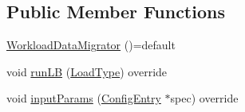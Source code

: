 \subsection*{Public Member Functions}
\begin{DoxyCompactItemize}
\item 
\hyperlink{structvt_1_1vrt_1_1collection_1_1balance_1_1replay_1_1_workload_data_migrator_a3bdffb57d5d79e7346117b92e4b01bee}{Workload\+Data\+Migrator} ()=default
\item 
void \hyperlink{structvt_1_1vrt_1_1collection_1_1balance_1_1replay_1_1_workload_data_migrator_a5de7ab375cff13a695c86523765904fa}{run\+LB} (\hyperlink{namespacevt_a8fb51741340b87d7aaee0bef60e9896b}{Load\+Type}) override
\item 
void \hyperlink{structvt_1_1vrt_1_1collection_1_1balance_1_1replay_1_1_workload_data_migrator_a768dc464610fec4cc39e20c055081c28}{input\+Params} (\hyperlink{structvt_1_1vrt_1_1collection_1_1balance_1_1_config_entry}{Config\+Entry} $\ast$spec) override
\end{DoxyCompactItemize}
